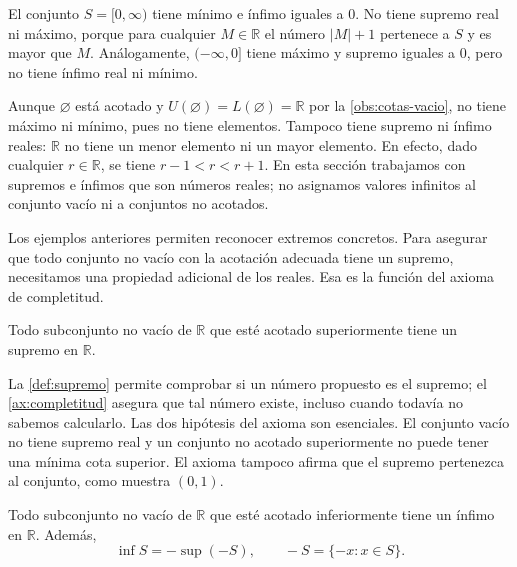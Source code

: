 \begin{example}
El conjunto $S=[0,\infty)$ tiene mínimo e ínfimo iguales a $0$. No tiene supremo real ni máximo, porque para cualquier $M\in\mathbb{R}$ el número $|M|+1$ pertenece a $S$ y es mayor que $M$. Análogamente, $(-\infty,0]$ tiene máximo y supremo iguales a $0$, pero no tiene ínfimo real ni mínimo.
\end{example}

\begin{example}
\label{ej:extremos-vacio}
Aunque $\varnothing$ está acotado y $U(\varnothing)=L(\varnothing)=\mathbb{R}$ por la \cref{obs:cotas-vacio}, no tiene máximo ni mínimo, pues no tiene elementos. Tampoco tiene supremo ni ínfimo reales: $\mathbb{R}$ no tiene un menor elemento ni un mayor elemento. En efecto, dado cualquier $r\in\mathbb{R}$, se tiene $r-1<r<r+1$. En esta sección trabajamos con supremos e ínfimos que son números reales; no asignamos valores infinitos al conjunto vacío ni a conjuntos no acotados.
\end{example}

Los ejemplos anteriores permiten reconocer extremos concretos. Para asegurar que todo conjunto no vacío con la acotación adecuada tiene un supremo, necesitamos una propiedad adicional de los reales. Esa es la función del axioma de completitud.

\begin{samepage}
\begin{axiom}
\label{ax:completitud}
Todo subconjunto no vacío de $\mathbb{R}$ que esté acotado superiormente tiene un supremo en $\mathbb{R}$.
\end{axiom}
\end{samepage}

La \cref{def:supremo} permite comprobar si un número propuesto es el supremo; el \cref{ax:completitud} asegura que tal número existe, incluso cuando todavía no sabemos calcularlo. Las dos hipótesis del axioma son esenciales. El conjunto vacío no tiene supremo real y un conjunto no acotado superiormente no puede tener una mínima cota superior. El axioma tampoco afirma que el supremo pertenezca al conjunto, como muestra $(0,1)$.

\begin{samepage}
\begin{theorem}
\label{teo:existencia-infimo}
Todo subconjunto no vacío de $\mathbb{R}$ que esté acotado inferiormente tiene un ínfimo en $\mathbb{R}$. Además,
\[
 \inf S=-\sup(-S),
 \qquad
 -S=\{-x:x\in S\}.
\]
\end{theorem}
\end{samepage}

